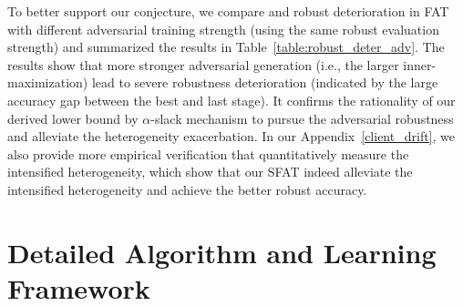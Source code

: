 \documentclass{article} %
\theoremstyle{plain}
\theoremstyle{definition}
\theoremstyle{remark}
\begin{document}
To better support our conjecture, we compare and robust deterioration in FAT with different adversarial training strength (using the same robust evaluation strength) and summarized the results in Table~\ref{table:robust_deter_adv}. The results show that more stronger adversarial generation (i.e., the larger inner-maximization) lead to severe robustness deterioration (indicated by the large accuracy gap between the best and last stage). It confirms the rationality of our derived lower bound by $\alpha$-slack mechanism to pursue the adversarial robustness and alleviate the heterogeneity exacerbation. In our Appendix~\ref{client_drift}, we also provide more empirical verification that quantitatively measure the intensified heterogeneity, which show that our SFAT indeed alleviate the intensified heterogeneity and achieve the better robust accuracy.


\section{Detailed Algorithm and Learning Framework}
\label{app:supp_alg}
\end{document}
